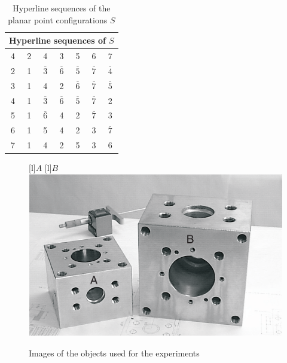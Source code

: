 \begin{table}[t!]
\begin{center}
\begin{small}
\begin{tabular}{|c|c|c|c|c|c|c|}
\hline 
\multicolumn{7}{|c|}{Hyperline sequences of $S$} \\  
\hline
\hline
 4 & 2 & 4 & 3 & 5 & 6 & 7 \\ \hline
 2 & 1 & $\overline{3}$ & $\overline{6}$ & $\overline{5}$ & $\overline{7}$ & $\overline{4}$ \\ \hline
 3 & 1 & 4 & 2 & $\overline{6}$ & $\overline{7}$ & $\overline{5}$ \\ \hline
 4 & 1 & $\overline{3}$ & $\overline{6}$ & $\overline{5}$ & $\overline{7}$ & 2 \\ \hline
 5 & 1 & $\overline{6}$ & 4 & 2 & $\overline{7}$ & 3 \\ \hline
 6 & 1 & 5 & 4 & 2 & 3 & $\overline{7}$ \\ \hline
 7 & 1 & 4 & 2 & 5 & 3 & 6 \\ \hline
\end{tabular}
\end{small}
\end{center}
\caption{Hyperline sequences of the planar point configurations $S$}
\end{table}





\begin{figure}[t!]
\begin{center}
[l]{$A$}
[l]{$B$}
\includegraphics[width=0.99\columnwidth]{../eps/cubos.eps} 
\caption{
Images of the objects used for the experiments 
}
\label{fig:objects}
\end{center}
\end{figure}




